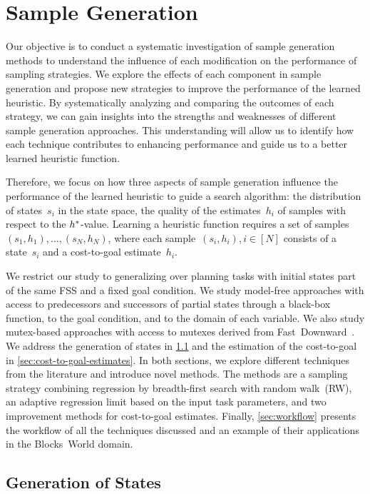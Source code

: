 \chapter{Sample Generation}
\label{sec:sampling}

Our objective is to conduct a systematic investigation of sample generation methods to understand the influence of each modification on the performance of sampling strategies. We explore the effects of each component in sample generation and propose new strategies to improve the performance of the learned heuristic. By systematically analyzing and comparing the outcomes of each strategy, we can gain insights into the strengths and weaknesses of different sample generation approaches. This understanding will allow us to identify how each technique contributes to enhancing performance and guide us to a better learned heuristic function.

Therefore, we focus on how three aspects of sample generation influence the performance of the learned heuristic to guide a search algorithm: the distribution of states~$s_i$ in the state space, the quality of the estimates~$h_i$ of samples with respect to the $h^{*}$-value. Learning a heuristic function requires a set of samples~$(s_1,h_1),\ldots,(s_N,h_N)$, where each sample~$(s_i,h_i), i\in[N]$ consists of a state~$s_i$ and a cost-to-goal estimate~$h_i$.

We restrict our study to generalizing over planning tasks with initial states part of the same FSS and a fixed goal condition. We study model-free approaches with access to predecessors and successors of partial states through a black-box function, to the goal condition, and to the domain of each variable. We also study mutex-based approaches with access to mutexes derived from Fast~Downward~\cite{helmert2006fast}. We address the generation of states in \cref{sec:state-generation} and the estimation of the cost-to-goal in \cref{sec:cost-to-goal-estimates}. In both sections, we explore different techniques from the literature and introduce novel methods. The methods are a sampling strategy combining regression by breadth-first search with random walk~(RW), an adaptive regression limit based on the input task parameters, and two improvement methods for cost-to-goal estimates. Finally, \cref{sec:workflow} presents the workflow of all the techniques discussed and an example of their applications in the Blocks~World domain.

\section{Generation of States}
\label{sec:state-generation}

